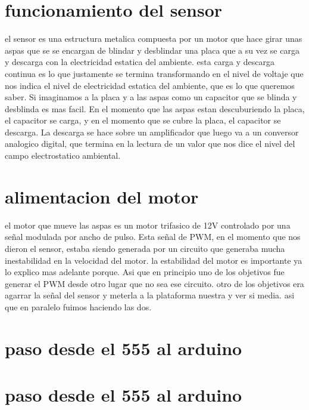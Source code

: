 \documentclass[a4paper]{article}
\begin{document}
\section{funcionamiento del sensor} %
\label{sec:funcionamiento_del_sensor}
el sensor es una estructura metalica compuesta por un motor que hace girar unas aspas que se se encargan de blindar y desblindar una placa que a su vez se carga y descarga con la electricidad estatica del ambiente. esta carga y descarga continua es lo que justamente se termina transformando en el nivel de voltaje que nos indica el nivel de electricidad estatica del ambiente, que es lo que queremos saber. Si imaginamos a la placa y a las aspas como un capacitor que se blinda y desblinda es mas facil. En el momento que las aspas estan descuburiendo la placa, el capacitor se carga, y en el momento que se cubre la placa, el capacitor se descarga. La descarga se hace sobre un amplificador que luego va a un conversor analogico digital, que termina en la lectura de un valor que nos dice el nivel del campo electrostatico ambiental.


\section{alimentacion del motor} %
\label{sec:alimentacion_del_motor}
el motor que mueve las aspas es un motor trifasico de 12V controlado por una señal modulada por ancho de pulso. Esta señal de PWM, en el momento que nos dieron el sensor, estaba siendo generada por un circuito que generaba mucha inestabilidad en la velocidad del motor. la estabilidad del motor es importante ya lo explico mas adelante porque. Asi que en principio uno de los objetivos fue generar el PWM desde otro lugar que no sea ese circuito. otro de los objetivos era agarrar la señal del sensor y meterla a la plataforma nuestra y ver si media. asi que en paralelo fuimos haciendo las dos.


\section*{paso desde el 555 al arduino}
\section{paso desde el 555 al arduino} %
\label{sec:paso_desde_el_555_al_arduino}
\end{document}
